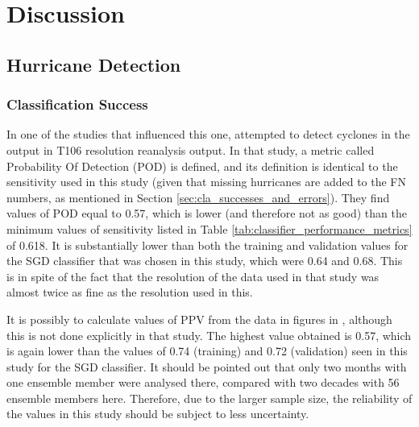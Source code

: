 \documentclass[pdftex,12pt,a4paper]{report}
\newcommand{\ts}{\textsuperscript}
\begin{document}

\chapter{Discussion}
\label{chap:discussion}

\section{Hurricane Detection}

\subsection{Classification Success}
\label{sec:classification_success}
In one of the studies that influenced this one, \textcite{walsh1997objective} attempted to detect
cyclones in the output in T106 resolution reanalysis output. In that study, a metric called
Probability Of Detection (POD) is defined, and its definition is identical to the sensitivity used
in this study (given that missing hurricanes are added to the FN numbers, as mentioned in Section
\ref{sec:cla_successes_and_errors}). They find values of POD equal to \SI{0.57}{}, which is
lower (and therefore not as good) than the minimum values of sensitivity listed in Table
\ref{tab:classifier_performance_metrics} of \SI{0.618}{}. It is substantially lower than both the
training and validation values for the SGD classifier that was chosen in this study, which were
\SI{0.64}{} and \SI{0.68}{}. This is in spite of the fact that the resolution of the data used in
that study was almost twice as fine as the resolution used in this.

It is possibly to calculate values of PPV from the data in figures in \textcite{walsh1997objective},
although this is not done explicitly in that study. The highest value obtained is \SI{0.57}{}, which
is again lower than the values of \SI{0.74}{} (training) and \SI{0.72}{} (validation) seen in this
study for the SGD classifier. It should be pointed out that only two months with one ensemble member
were analysed there, compared with two decades with 56 ensemble members here. Therefore, due to the
larger sample size, the reliability of the values in this study should be subject to less
uncertainty.
\end{document}
